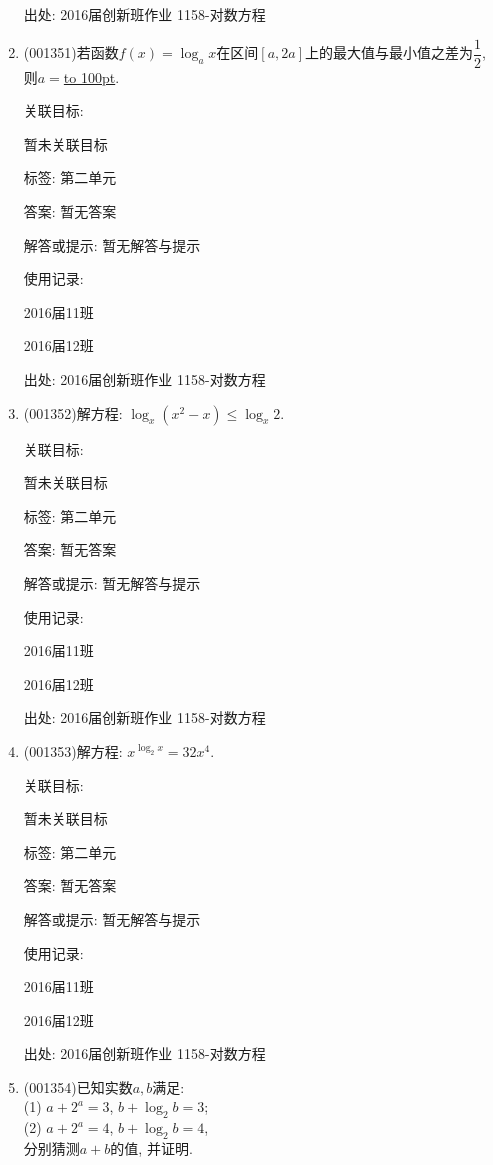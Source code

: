 \documentclass[10pt,a4paper]{article}
\newcommand{\blank}[1]{\underline{\hbox to #1pt{}}}
\begin{document}
\begin{enumerate}[1.]
出处: 2016届创新班作业	1158-对数方程
\item { (001351)}若函数$f(x)=\log_a x$在区间$[a,2a]$上的最大值与最小值之差为$\dfrac{1}{2}$, 则$a=$\blank{100}.


关联目标:

暂未关联目标



标签: 第二单元

答案: 暂无答案

解答或提示: 暂无解答与提示

使用记录:

2016届11班	

2016届12班	


出处: 2016届创新班作业	1158-对数方程
\item { (001352)}解方程: $\log_x(x^2-x)\le \log_x 2$.


关联目标:

暂未关联目标



标签: 第二单元

答案: 暂无答案

解答或提示: 暂无解答与提示

使用记录:

2016届11班	

2016届12班	


出处: 2016届创新班作业	1158-对数方程
\item { (001353)}解方程: $x^{\log_2 x}=32x^4$.


关联目标:

暂未关联目标



标签: 第二单元

答案: 暂无答案

解答或提示: 暂无解答与提示

使用记录:

2016届11班	

2016届12班	


出处: 2016届创新班作业	1158-对数方程
\item { (001354)}已知实数$a,b$满足: \\ 
(1) $a+2^a=3$, $b+\log_2 b=3$;\\ 
(2) $a+2^a=4$, $b+\log_2 b=4$, \\ 
分别猜测$a+b$的值, 并证明.



\end{enumerate}
\end{document}
